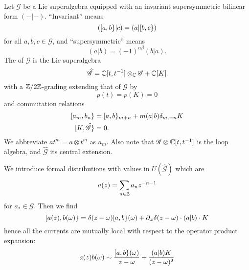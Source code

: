 \M
Let $\mathscr{G}$ be a Lie superalgebra equipped with an invariant
supersymmetric bilinear form $(-|-)$. ``Invariant'' means
\begin{equation}
([a,b\}|c)=(a|[b,c\})
\end{equation}
for all $a,b,c\in\mathscr{G}$, and ``supersymmetric'' means
\begin{equation}
(a|b)=(-1)^{\alpha\beta}(b|a).
\end{equation}
The  of $\mathscr{G}$ is the Lie superalgebra
\begin{equation}
\widehat{\mathscr{G}}=\mathbb{C}[t,t^{-1}]\otimes_{\mathbb{C}}\mathscr{G}+\mathbb{C}[K]
\end{equation}
with a $\mathbb{Z}/2\mathbb{Z}$-grading extending that of $\mathscr{G}$ by
\begin{equation}
p(t)=p(K)=0
\end{equation}
and commutation relations
\begin{equation}
\begin{split}
\superb{a_m}{b_n} &= \superb{a}{b}_{m+n}+m(a|b)\delta_{m,-n}K\\
\superb{K}{\widehat{\mathscr{G}}}&=0.
\end{split}
\end{equation}
We abbreviate $at^{m}=a\otimes t^{m}$ as $a_{m}$. Also note that
$\mathscr{G}\otimes\mathbb{C}[t,t^{-1}]$ is the loop algebra, and
$\widehat{\mathscr{G}}$ its central extension.

\M
We introduce formal distributions with values in
$U(\widehat{\mathscr{G}})$ which are 
\begin{equation}
a(z)=\sum_{n\in\mathbb{Z}}a_{n}z^{-n-1}
\end{equation}
for $a_{*}\in\mathscr{G}$. Then we find
\begin{equation}
[a(z),b(\omega)\} = 
\delta(z-\omega)[a,b\}(\omega) + \partial_{\omega}\delta(z-\omega)\cdot(a|b)\cdot{K}
\end{equation}
hence all the currents are mutually local with respect to the operator
product expansion:
\begin{equation}
a(z)b(\omega)\sim\frac{[a,b\}(\omega)}{z-\omega}+\frac{(a|b)K}{(z-\omega)^{2}}
\end{equation}

